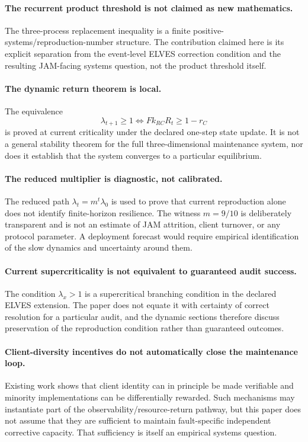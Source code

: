 \paragraph{The recurrent product threshold is not claimed as new mathematics.}
The three-process replacement inequality is a finite positive-systems/reproduction-number structure. The contribution claimed here is its explicit separation from the event-level ELVES correction condition and the resulting JAM-facing systems question, not the product threshold itself.

\paragraph{The dynamic return theorem is local.}
The equivalence
\[
\lambda_{t+1}\ge1
\iff
Fk_{RC}R_t\ge1-r_C
\]
is proved at current criticality under the declared one-step state update. It is not a general stability theorem for the full three-dimensional maintenance system, nor does it establish that the system converges to a particular equilibrium.

\paragraph{The reduced multiplier is diagnostic, not calibrated.}
The reduced path $\lambda_t=m^t\lambda_0$ is used to prove that current reproduction alone does not identify finite-horizon resilience. The witness $m=9/10$ is deliberately transparent and is not an estimate of JAM attrition, client turnover, or any protocol parameter. A deployment forecast would require empirical identification of the slow dynamics and uncertainty around them.

\paragraph{Current supercriticality is not equivalent to guaranteed audit success.}
The condition $\lambda_x>1$ is a supercritical branching condition in the declared ELVES extension. The paper does not equate it with certainty of correct resolution for a particular audit, and the dynamic sections therefore discuss preservation of the reproduction condition rather than guaranteed outcomes.

\paragraph{Client-diversity incentives do not automatically close the maintenance loop.}
Existing work shows that client identity can in principle be made verifiable and minority implementations can be differentially rewarded. Such mechanisms may instantiate part of the observability/resource-return pathway, but this paper does not assume that they are sufficient to maintain fault-specific independent corrective capacity. That sufficiency is itself an empirical systems question.

